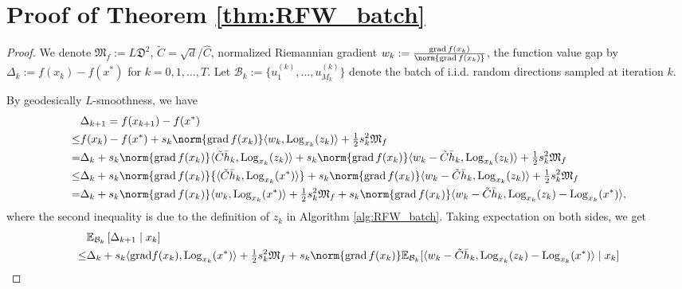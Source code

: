 \documentclass{article}
\newcommand{\Log}{\mathrm{Log}}
\theoremstyle{plain}
\theoremstyle{definition}
\theoremstyle{remark}
\begin{document}
\section{Proof of Theorem \ref{thm:RFW_batch}}\label{pf:RFW_batch}
\begin{proof}
We denote $\mathfrak{M}_f:={L}\mathfrak{D}^2$, $\tilde{C}=\sqrt{d}/\hat{C}$, normalized Riemannian gradient $w_k:= \frac{\operatorname{grad}f(x_k)}{\norm{\operatorname{grad}f(x_k)}}$, the function value gap by $\Delta_{k}:=f(x_{k}) - f(x^*)$ for $k=0,1,\ldots,T$. Let $\mathcal{B}_k := \{u^{(k)}_{1}, \dots, u^{(k)}_{M_k}\}$ denote the batch of i.i.d. random directions sampled at iteration $k$.

By geodesically $L$-smoothness, we have
\begin{align*}
\begin{aligned}
& \Delta_{k+1} = f(x_{k+1}) - f(x^*) \\
\leq & f(x_k) - f(x^*) 
   + s_k \norm{\operatorname{grad}f(x_k)}\langle w_k,  \Log_{x_k}(z_k) \rangle 
   + \tfrac{1}{2}s_k^2 \mathfrak{M}_f \\
   = & \Delta_{k}
   + s_k \norm{\operatorname{grad}f(x_k)}\langle \tilde{C}\bar h_k,  \Log_{x_k}(z_k) \rangle +s_k \norm{\operatorname{grad}f(x_k)}\langle w_k-\tilde{C}\bar h_k,  \Log_{x_k}(z_k) \rangle 
   + \tfrac{1}{2}s_k^2 \mathfrak{M}_f \\
   \leq & \Delta_{k}
   + s_k \norm{\operatorname{grad}f(x_k)}{\langle\tilde{C} \bar h_k,  \Log_{x_k}(x^*)\rangle} +s_k \norm{\operatorname{grad}f(x_k)}\langle w_k-\tilde{C}\bar h_k,  \Log_{x_k}(z_k) \rangle +
   \tfrac{1}{2}s_k^2 \mathfrak{M}_f \\
   = & \Delta_{k} 
   + s_k \norm{\operatorname{grad}f(x_k)}\langle w_k,  \Log_{x_k}(x^*) \rangle+ \tfrac{1}{2}s_k^2 \mathfrak{M}_f  +s_k \norm{\operatorname{grad}f(x_k)}\langle w_k-\tilde{C}\bar h_k,  \Log_{x_k}(z_k)-\Log_{x_k}(x^*)\rangle,
\end{aligned}
\end{align*}
where the second inequality is due to the definition of $z_k$ in Algorithm \ref{alg:RFW_batch}.
Taking expectation on both sides, we get
\begin{align}
&\mathbb{E}_{\mathcal{B}_k}\left[\Delta_{k+1}\mid x_k\right] \nonumber\\
\leq & \Delta_{k}
   + s_k \langle \mathrm{grad}f(x_k),  \Log_{x_k}(x^*) \rangle+ \tfrac{1}{2}s_k^2 \mathfrak{M}_f +s_k\norm{\operatorname{grad}f(x_k)}\mathbb{E}_{\mathcal{B}_k}[\langle w_k-\tilde{C}\bar h_k,\Log_{x_k}(z_k)-\Log_{x_k}(x^*)\rangle \mid x_k]\nonumber \\

\end{align}
\end{proof}
\end{document}
